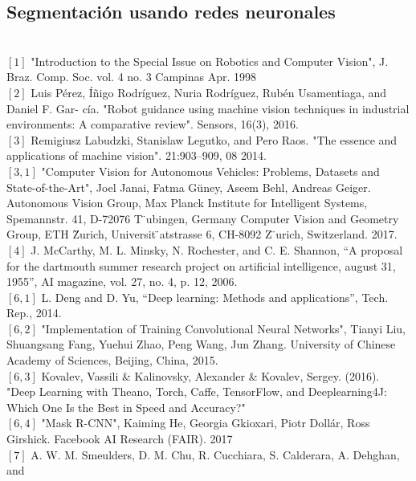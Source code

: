 \documentclass{bmvc2k}
\begin{document}
\subsection{Segmentación usando redes neuronales}
\\
$\left[1\right]$  "Introduction to the Special Issue on Robotics and Computer Vision", J. Braz. Comp. Soc. vol. 4 no. 3 Campinas Apr. 1998\\
$\left[2\right]$  Luis Pérez, Íñigo Rodríguez, Nuria Rodríguez, Rubén Usamentiaga, and Daniel F. Gar-
cía.   "Robot  guidance  using  machine  vision  techniques  in  industrial  environments:  A comparative review". Sensors, 16(3), 2016. \\
$\left[3\right]$  Remigiusz Labudzki, Stanislaw Legutko, and Pero Raos.  "The essence and applications
of machine vision". 21:903–909, 08 2014.\\
$\left[3,1\right]$  "Computer Vision for Autonomous Vehicles: Problems, Datasets and State-of-the-Art",
Joel Janai, Fatma Güney, Aseem Behl, Andreas Geiger. Autonomous Vision Group, Max Planck Institute for Intelligent Systems, Spemannstr. 41, D-72076 T  ̈ubingen, Germany
Computer Vision and Geometry Group, ETH Z̈urich, Universit ̈atstrasse 6, CH-8092 Z  ̈urich, Switzerland. 2017.\\
$\left[4\right]$  J. McCarthy, M. L. Minsky, N. Rochester, and C. E. Shannon, “A proposal for the
dartmouth summer research project on artificial intelligence, august 31, 1955”, AI
magazine, vol. 27, no. 4, p. 12, 2006.\\
$\left[6,1\right]$  L. Deng and D. Yu, “Deep learning: Methods and applications”, Tech. Rep.,
2014. \\
$\left[6,2\right]$  "Implementation of Training Convolutional Neural Networks", Tianyi Liu, Shuangsang Fang, Yuehui Zhao, Peng Wang, Jun Zhang. University
of
Chinese
Academy
of
Sciences,
Beijing,
China, 2015.\\
$\left[6,3\right]$  Kovalev, Vassili & Kalinovsky, Alexander & Kovalev, Sergey. (2016). "Deep Learning with Theano, Torch, Caffe, TensorFlow, and Deeplearning4J: Which One Is the Best in Speed and Accuracy?"\\
$\left[6,4\right]$  "Mask R-CNN", Kaiming He, Georgia Gkioxari, Piotr Dollár, Ross Girshick. Facebook AI Research (FAIR). 2017\\
$\left[7\right]$  A. W. M. Smeulders, D. M. Chu, R. Cucchiara, S. Calderara, A. Dehghan, and
\end{document}
